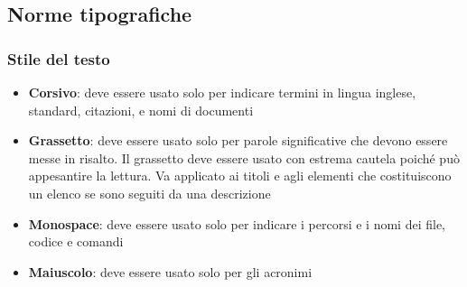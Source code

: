 \documentclass[12pt,a4paper]{article}
\begin{document}
\subsection{Norme tipografiche}\label{norme tipografiche}

\subsubsection{Stile del testo}
\begin{itemize}
	\item \textbf{Corsivo}: deve essere usato solo per indicare termini in lingua inglese, standard, citazioni,  e nomi di documenti
	\item \textbf{Grassetto}: deve essere usato solo per parole significative che devono essere messe in risalto. Il grassetto deve essere usato con estrema cautela poiché può appesantire la lettura. Va applicato ai titoli e agli elementi che costituiscono un elenco se sono seguiti da una descrizione
	\item \textbf{Monospace}: deve essere usato solo per indicare i percorsi e i nomi dei file, codice e comandi
	\item \textbf{Maiuscolo}: deve essere usato solo per gli acronimi
\end{itemize}
\end{document}
